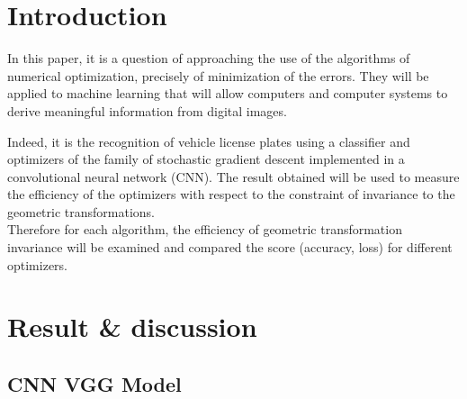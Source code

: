 \documentclass[lnbip]{svmultln}
\begin{document}
%
\section{Introduction}
%
	In this paper, it is a question of approaching the use of the algorithms of numerical optimization, precisely of minimization of the errors. They will be applied to machine learning that will allow computers and computer systems to derive meaningful information from digital images.
	
	Indeed, it is the recognition of vehicle license plates using a classifier and optimizers of the family of stochastic gradient descent implemented in a convolutional neural network (CNN). The result obtained will be used to measure the efficiency of the optimizers with respect to the constraint of invariance to the geometric transformations.\\
	Therefore for each algorithm, the efficiency of geometric transformation invariance will be examined and compared the score (accuracy, loss) for different optimizers.




%
\section{Result \& discussion}
%	
	\subsection{CNN VGG Model }
	
\end{document}
